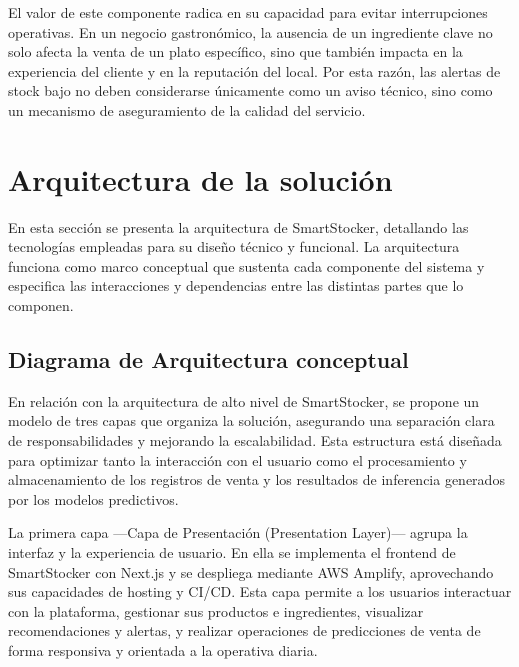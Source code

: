 El valor de este componente radica en su capacidad para evitar interrupciones operativas. En un negocio gastronómico, la ausencia de un ingrediente clave no solo afecta la venta de un plato específico, sino que también impacta en la experiencia del cliente y en la reputación del local. Por esta razón, las alertas de stock bajo no deben considerarse únicamente como un aviso técnico, sino como un mecanismo de aseguramiento de la calidad del servicio.


\section{Arquitectura de la solución}\label{sec:arquitectura-solucion}
En esta sección se presenta la arquitectura de SmartStocker, detallando las tecnologías empleadas para su diseño técnico y funcional. La arquitectura funciona como marco conceptual que sustenta cada componente del sistema y especifica las interacciones y dependencias entre las distintas partes que lo componen.

\subsection{Diagrama de Arquitectura conceptual}\label{sec:arquitectura-conceptual}
En relación con la arquitectura de alto nivel de SmartStocker, se propone un modelo de tres capas que organiza la solución, asegurando una separación clara de responsabilidades y mejorando la escalabilidad. Esta estructura está diseñada para optimizar tanto la interacción con el usuario como el procesamiento y almacenamiento de los registros de venta y los resultados de inferencia generados por los modelos predictivos.

La primera capa —Capa de Presentación (Presentation Layer)— agrupa la interfaz y la experiencia de usuario. En ella se implementa el frontend de SmartStocker con Next.js y se despliega mediante AWS Amplify, aprovechando sus capacidades de hosting y CI/CD. Esta capa permite a los usuarios interactuar con la plataforma, gestionar sus productos e ingredientes, visualizar recomendaciones y alertas, y realizar operaciones de predicciones de venta de forma responsiva y orientada a la operativa diaria.

